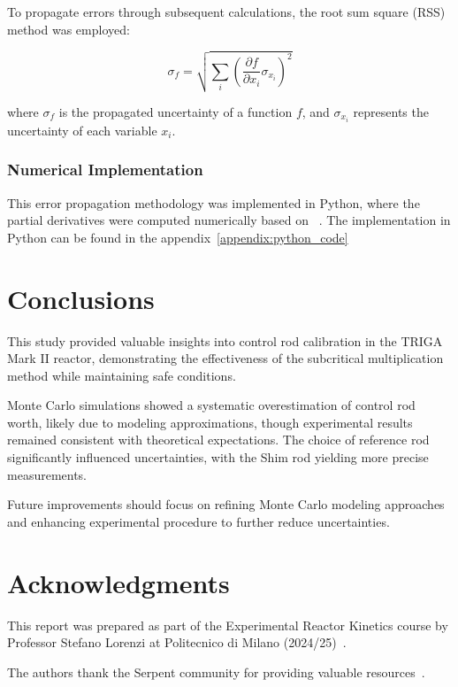 To propagate errors through subsequent calculations, the root sum square (RSS) method was employed:

\begin{equation}
\sigma_f = \sqrt{\sum_{i} \left( \frac{\partial f}{\partial x_i} \sigma_{x_i} \right)^2}
\end{equation}

where $\sigma_f$ is the propagated uncertainty of a function $f$, and $\sigma_{x_i}$ represents the uncertainty of each variable $x_i$.

\subsubsection{Numerical Implementation}

This error propagation methodology was implemented in Python, where the partial derivatives were computed numerically based on ~\cite{Moffat1988}. 
The implementation in Python can be found in the appendix~\ref{appendix:python_code}

\section{Conclusions}
This study provided valuable insights into control rod calibration in the TRIGA Mark II reactor, 
demonstrating the effectiveness of the subcritical multiplication method while maintaining safe conditions. 

Monte Carlo simulations showed a systematic overestimation of control rod worth, likely due to modeling approximations, 
though experimental results remained consistent with theoretical expectations. 
The choice of reference rod significantly influenced uncertainties, with the Shim rod yielding more precise measurements. 

Future improvements should focus on refining Monte Carlo modeling approaches and enhancing experimental procedure to further reduce uncertainties.

\section*{Acknowledgments}
This report was prepared as part of the Experimental Reactor Kinetics course by Professor Stefano Lorenzi at Politecnico di Milano (2024/25)~\parencite{Lorenzi2024}.

The authors thank the Serpent community for providing valuable resources~\parencite{SerpentWiki, SerpentForum}. 

